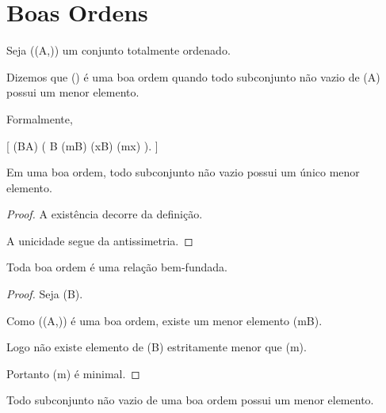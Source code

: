 \documentclass[../../main]{subfiles}
\begin{document}
\section{Boas Ordens}
\label{sec:matematica:relacoes:boas-ordens}

\begin{defn}
	\label{def:matematica:relacoes:boa-ordem}

	Seja ((A,\le)) um conjunto totalmente ordenado.

	Dizemos que (\le) é uma boa ordem quando todo subconjunto não vazio
	de (A) possui um menor elemento.

	Formalmente,

	[
			(\forall B\subseteq A)
			\Bigl(
			B\neq\varnothing
			\Rightarrow
				(\exists m\in B)
				(\forall x\in B)
				(m\le x)
			\Bigr).
		]

\end{defn}

\begin{prop}
	\label{prop:matematica:relacoes:boa-ordem-menor-unico}

	Em uma boa ordem, todo subconjunto não vazio possui um único menor
	elemento.

\end{prop}

\begin{proof}

	A existência decorre da definição.

	A unicidade segue da antissimetria.

\end{proof}

\begin{prop}
	\label{prop:matematica:relacoes:boa-ordem-bem-fundada}

	Toda boa ordem é uma relação bem-fundada.
\end{prop}

\begin{proof}

	Seja (B\neq\varnothing).

	Como ((A,\le)) é uma boa ordem, existe um menor elemento
	(m\in B).

	Logo não existe elemento de (B) estritamente menor que (m).

	Portanto (m) é minimal.

\end{proof}

\begin{prop}
	\label{prop:matematica:relacoes:principio-boa-ordem}

	Todo subconjunto não vazio de uma boa ordem possui um menor elemento.

\end{prop}
\end{document}
